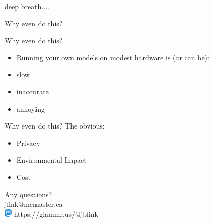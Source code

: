 \documentclass{beamer}
\begin{document}
	
\begin{frame}
	deep breath....
\end{frame}
	
\begin{frame}
	Why even do this?
\end{frame}
	
\begin{frame}{Why even do this?}
\begin{itemize}
	\item Running your own models on modest hardware is (or can be):
	\pause
	\item slow
	\pause
	\item inaccurate
	\pause
	\item annoying
\end{itemize}  
\end{frame}

\begin{frame}{Why even do this?}
	The obvious:
	\begin{itemize}
		\item Privacy
		\pause
		\item Environmental Impact
		\pause 
		\item Cost
		
	\end{itemize}
\end{frame}



\begin{frame}
	Any questions?\\ 
	jfink@mcmaster.ca\\
	\includegraphics[left, height=4mm]{mastodon} \hspace{1mm}  https://glammr.us/@jbfink
	
\end{frame}
\end{document}
